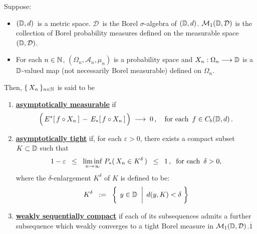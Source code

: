 \begin{definition}
\mbox{}\vskip 0.1cm
\noindent
Suppose:
\begin{itemize}
\item
	$(\mathbb{D},d)$\, is a metric space.
	$\mathcal{D}$\, is the Borel $\sigma$-algebra of $(\mathbb{D},d)$.
	\vskip 0.0cm
	$\mathcal{M}_{1}(\mathbb{D},\mathcal{D})$ is the collection of Borel probability measures
	defined on the measurable space $(\mathbb{D},\mathcal{D})$.
\item
	For each $n \in \mathbb{N}$,
	$(\Omega_{n},\mathcal{A}_{n},\mu_{n})$ is a probability space and
	$X_{n} : \Omega_{n} \longrightarrow \mathbb{D}$
	is a $\mathbb{D}$-valued map (not necessarily Borel measurable) defined on $\Omega_{n}$.
\end{itemize}
Then, $\{\,X_{n}\,\}_{n\in\mathbb{N}}$ is said to be
\begin{enumerate}
\item
	\underline{\textbf{asymptotically measurable}}\; if
	\begin{equation*}
	\left(\, \overset{{\color{white}.}}{E^{*}}\!\left[\,f \circ X_{n}\,\right] \,-\, E_{*}\!\left[\,f \circ X_{n}\,\right] \,\right)
	\;\longrightarrow\;
	0\,,
	\quad
	\textnormal{for each \,$f \in C_{b}(\D,d)$}\,.
	\end{equation*}
\item
	\underline{\textbf{asymptotically tight}}\; if, for each $\varepsilon > 0$, there exists
	a compact subset $K \subset \mathbb{D}$ such that
	\begin{equation*}
	1 - \varepsilon
	\;\; \leq \;\; \underset{n\rightarrow\infty}{\liminf}\; P_{*}(\,X_{n} \in K^{\delta}\,)
	\;\; \leq \;\; 1\,,
	\;\;
	\textnormal{for each \,$\delta > 0$},
	\end{equation*}
	where the $\delta$-enlargement $K^{\delta}$ of $K$ is defined to be:
	\begin{equation*}
	K^{\delta}
		\;\; := \;\;
		\left\{\;
		\left.
		y \overset{{\color{white}-}}{\in} \D
		\;\;\right\vert\;
		d(y,K) < \delta
		\;\right\}
	\end{equation*}
\item
	\underline{\textbf{weakly sequentially compact}}\; if each of its subsequences
	admits a further subsequence which weakly converges to a {\color{red}tight}
	Borel measure in $\mathcal{M}_{1}(\mathbb{D},\mathcal{D})$.{\color{white}$\overset{.}{1}$}
\end{enumerate}
\end{definition}


